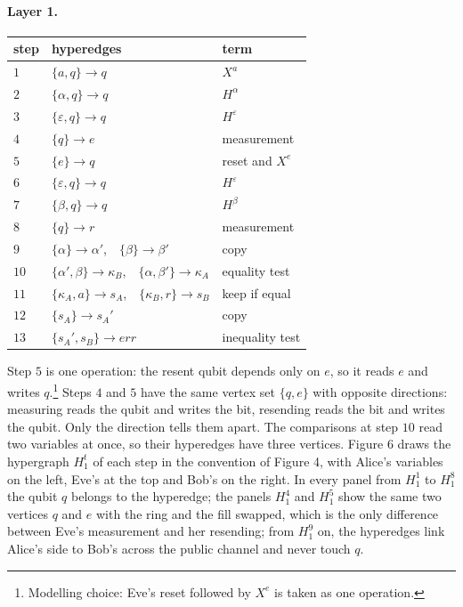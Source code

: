 \documentclass[11pt]{article}
\begin{document}
\paragraph{Layer 1.}
\begin{center}
\begin{tabular}{lll}
\hline
step & hyperedges & term\\
\hline
$1$ & $\{a,q\}\to q$ & $X^{a}$\\
$2$ & $\{\alpha,q\}\to q$ & $H^{\alpha}$\\
$3$ & $\{\varepsilon,q\}\to q$ & $H^{\varepsilon}$\\
$4$ & $\{q\}\to e$ & measurement\\
$5$ & $\{e\}\to q$ & reset and $X^{e}$\\
$6$ & $\{\varepsilon,q\}\to q$ & $H^{\varepsilon}$\\
$7$ & $\{\beta,q\}\to q$ & $H^{\beta}$\\
$8$ & $\{q\}\to r$ & measurement\\
$9$ & $\{\alpha\}\to\alpha'$,\ \ $\{\beta\}\to\beta'$ & copy\\
$10$ & $\{\alpha',\beta\}\to\kappa_B$,\ \ $\{\alpha,\beta'\}\to\kappa_A$ & equality test\\
$11$ & $\{\kappa_A,a\}\to s_A$,\ \ $\{\kappa_B,r\}\to s_B$ & keep if equal\\
$12$ & $\{s_A\}\to s_A'$ & copy\\
$13$ & $\{s_A',s_B\}\to\mathit{err}$ & inequality test\\
\hline
\end{tabular}
\end{center}
Step $5$ is one operation: the resent qubit depends only on $e$, so it reads $e$ and writes $q$.\footnote{Modelling choice: Eve's reset followed by $X^{e}$ is taken as one operation.} Steps $4$ and $5$ have the same vertex set $\{q,e\}$ with opposite directions: measuring reads the qubit and writes the bit, resending reads the bit and writes the qubit. Only the direction tells them apart. The comparisons at step $10$ read two variables at once, so their hyperedges have three vertices. Figure 6 draws the hypergraph $H_1^t$ of each step in the convention of Figure 4, with Alice's variables on the left, Eve's at the top and Bob's on the right. In every panel from $H_1^1$ to $H_1^8$ the qubit $q$ belongs to the hyperedge; the panels $H_1^4$ and $H_1^5$ show the same two vertices $q$ and $e$ with the ring and the fill swapped, which is the only difference between Eve's measurement and her resending; from $H_1^9$ on, the hyperedges link Alice's side to Bob's across the public channel and never touch $q$.
\end{document}
